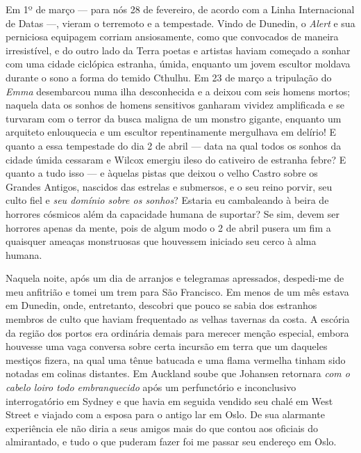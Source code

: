 Em 1º de março --- para nós 28 de fevereiro, de
acordo com a Linha Internacional de Datas ---, vieram o terremoto 
e a tempestade. Vindo de Dunedin, o \emph{Alert} e sua perniciosa equipagem
corriam ansiosamente, como que convocados de maneira irresistível, e do
outro lado da Terra poetas e artistas haviam começado a sonhar com uma
cidade ciclópica estranha, úmida, enquanto um jovem escultor moldava
durante o sono a forma do temido Cthulhu. Em 23 de março a tripulação do
\emph{Emma} desembarcou numa ilha desconhecida e a deixou com seis
homens mortos; naquela data os sonhos de homens sensitivos ganharam
vividez amplificada e se turvaram com o terror da busca maligna de um
monstro gigante, enquanto um arquiteto enlouquecia e um escultor
repentinamente mergulhava em delírio! E quanto a essa tempestade do dia
2 de abril --- data na qual todos os sonhos da cidade úmida cessaram e
Wilcox emergiu ileso do cativeiro de estranha febre? E quanto a tudo
isso --- e àquelas pistas que deixou o velho Castro sobre os Grandes
Antigos, nascidos das estrelas e submersos, e o seu reino porvir, seu
culto fiel e \emph{seu domínio sobre os sonhos}? Estaria eu cambaleando
à beira de horrores cósmicos além da capacidade humana de suportar? Se
sim, devem ser horrores apenas da mente, pois de algum modo o 2 de
abril pusera um fim a quaisquer ameaças monstruosas que houvessem
iniciado seu cerco à alma humana.

Naquela noite, após um dia de arranjos e telegramas apressados,
despedi-me de meu anfitrião e tomei um trem para São Francisco. Em menos
de um mês estava em Dunedin, onde, entretanto, descobri que pouco se
sabia dos estranhos membros de culto que haviam frequentado as velhas
tavernas da costa. A escória da região dos portos era ordinária demais
para merecer menção especial, embora houvesse uma vaga conversa sobre
certa incursão em terra que um daqueles mestiços fizera, na qual uma
tênue batucada e uma flama vermelha tinham sido notadas em colinas
distantes. Em Auckland soube que Johansen retornara \emph{com o cabelo
loiro todo embranquecido} após um perfunctório e inconclusivo
interrogatório em Sydney e que havia em seguida vendido seu chalé em West
Street e viajado com a esposa para o antigo lar em Oslo. De sua
alarmante experiência ele não diria a seus amigos mais do que contou aos
oficiais do almirantado, e tudo o que puderam fazer foi me passar seu
endereço em Oslo.


